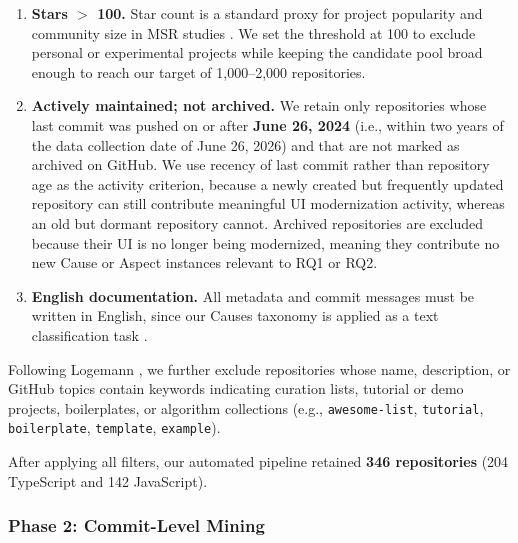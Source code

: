 \documentclass{article}
\begin{document}
\begin{enumerate}
    We acknowledge that this heuristic may miss monorepos whose UI
    dependency is declared in a subdirectory \texttt{package.json} rather
    than the root, and treat such cases as a known limitation.

    \item \textbf{Stars $>$ 100.}
    Star count is a standard proxy for project popularity and community
    size in MSR studies \cite{kalliamvakou2014promises}. We set the
    threshold at 100 to exclude personal or experimental projects while
    keeping the candidate pool broad enough to reach our target of
    1,000--2,000 repositories.

    \item \textbf{Actively maintained; not archived.}
    We retain only repositories whose last commit was pushed on or after
    \textbf{June 26, 2024} (i.e., within two years of the data collection
    date of June 26, 2026) and that are not marked as archived on GitHub.
    We use recency of last commit rather than repository age as the
    activity criterion, because a newly created but frequently updated
    repository can still contribute meaningful UI modernization activity,
    whereas an old but dormant repository cannot. Archived repositories
    are excluded because their UI is no longer being modernized, meaning
    they contribute no new Cause or Aspect instances relevant to RQ1
    or RQ2.

    \item \textbf{English documentation.}
    All metadata and commit messages must be
    written in English, since our Causes taxonomy is applied as a text
    classification task \cite{lamine2022understanding}.
\end{enumerate}

Following Logemann \cite{logemann2024file}, we further exclude
repositories whose name, description, or GitHub topics contain keywords
indicating curation lists, tutorial or demo projects, boilerplates, or
algorithm collections (e.g., \texttt{awesome-list}, \texttt{tutorial},
\texttt{boilerplate}, \texttt{template}, \texttt{example}).

After applying all filters, our automated pipeline retained
\textbf{346 repositories} (204 TypeScript and 142 JavaScript).

\subsubsection{Phase 2: Commit-Level Mining}
\label{sec:commit-mining}
\end{document}
